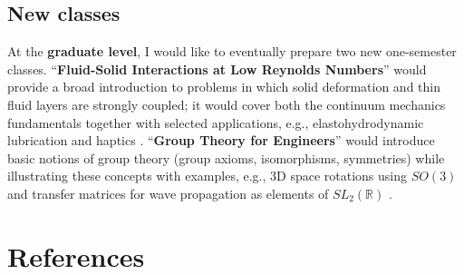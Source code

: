 \documentclass[11pt]{amsart}
\begin{document}
\subsection*{New classes}
At the \textbf{graduate level}, I would like to eventually prepare two new one-semester classes.  
%
``\textbf{Fluid-Solid Interactions at Low Reynolds Numbers}'' would provide a broad introduction to problems in which solid deformation and thin fluid layers are strongly coupled; it would cover both the continuum mechanics fundamentals together with selected applications, e.g., elastohydrodynamic lubrication \cite{EHL} and haptics \cite{haptics}.  
%
``\textbf{Group Theory for Engineers}'' would introduce basic notions of group theory \cite{Artin}
(group axioms, isomorphisms, symmetries) 
while illustrating these concepts with examples, e.g., 3D space rotations using $SO(3)$ and transfer matrices for wave propagation as elements of $SL_2 (\mathbb{R})$ \cite{JMPS}. 

\newpage

\thispagestyle{plain}
%
%
% 
% 



\section*{References}
\end{document}
